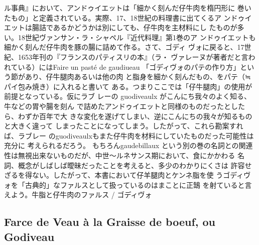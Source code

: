 {{{{  ル事典』において、アンドゥイエットは「細かく刻んだ仔牛肉を楕円形に
  巻いたもの」と定義されている。実際、17、18世紀の料理書に出てくるア
  ンドゥイエットは腸詰であるかどうかは別にしても、仔牛肉を主材料にし
  たものが多い。18世紀ヴァンサン・ラ・シャペル『近代料理』第1巻のア
  ンドゥイエットも細かく刻んだ仔牛肉を豚の腸に詰めて作る。さて、ゴディ
  ヴォに戻ると、17世紀、1653年刊の『フランスのパティスリの本』（ラ・
  ヴァレーヌが著者だと言われている）にはFaire un pasté de gaudiueau
  「ゴディヴォのパテの作り方」という節があり、仔牛腿肉あるいは他の肉
  と脂身を細かく刻んだもの、をパテ（≒パイ包み焼き）に入れると書いて
  ある。つまりここでは「仔牛腿肉」の使用が前提となっている。仮にラブ
  レーの guodiveaulx がこんにち我々のよく知る、牛などの胃や腸を刻ん
  で詰めたアンドゥイエットと同様のものだったとしたら、わずか百年で大
  きな変化を遂げてしまい、逆にこんにちの我々が知るものと大きく違って
  しまったことになってしまう。したがって、これら勘案すれば、ラブレー
  のguodiveaulxもまた仔牛肉を材料にしていたものだった可能性は充分に
  考えられるだろう。 もちろんgaudebillaux という別の巻の名詞との関連
  性は無視出来ないものだが、中世〜ルネサンス期において、食にかかわる
  名詞、概念がしばしば曖昧だったことを考えると、多少のわかりにくさは
  許容せざるを得ない。したがって、本書において仔羊腿肉とケンネ脂を使
  うゴディヴォを「古典的」なファルスとして扱っているのはまことに正鵠
  を射ていると言えよう。}}{牛脂と仔牛肉のファルス / ゴディヴォ}}\label{ux725bux8102ux3068ux4ed4ux725bux8089ux306eux30d5ux30a1ux30ebux30b9-ux30b4ux30c7ux30a3ux30f4ux30a920}}

\vspace*{-1.7\zw}

\hypertarget{farce-de-veau-uxe0-la-graisse-de-boeuf-ou-godiveau}{%
\subsection{Farce de Veau à la Graisse de boeuf, ou
Godiveau}\label{farce-de-veau-uxe0-la-graisse-de-boeuf-ou-godiveau}}

